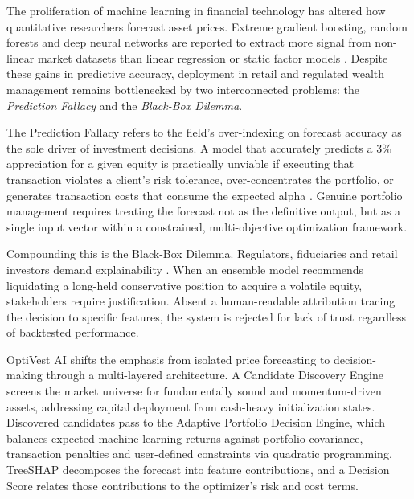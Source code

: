 \documentclass[conference]{IEEEtran}
\begin{document}
The proliferation of machine learning in financial technology has
altered how quantitative researchers forecast asset prices. Extreme
gradient boosting, random forests and deep neural networks are reported
to extract more signal from non-linear market datasets than linear
regression or static factor models \cite{gu2020}. Despite these gains
in predictive accuracy, deployment in retail and regulated wealth
management remains bottlenecked by two interconnected problems: the
\emph{Prediction Fallacy} and the \emph{Black-Box Dilemma}.

The Prediction Fallacy refers to the field's over-indexing on forecast
accuracy as the sole driver of investment decisions. A model that
accurately predicts a $3\%$ appreciation for a given equity is
practically unviable if executing that transaction violates a client's
risk tolerance, over-concentrates the portfolio, or generates
transaction costs that consume the expected alpha \cite{demiguel2009}.
Genuine portfolio management requires treating the forecast not as the
definitive output, but as a single input vector within a constrained,
multi-objective optimization framework.

Compounding this is the Black-Box Dilemma. Regulators, fiduciaries and
retail investors demand explainability \cite{barredoarrieta2020}. When
an ensemble model recommends liquidating a long-held conservative
position to acquire a volatile equity, stakeholders require
justification. Absent a human-readable attribution tracing the decision
to specific features, the system is rejected for lack of trust
regardless of backtested performance.

OptiVest AI shifts the emphasis from isolated price forecasting to
decision-making through a multi-layered architecture. A Candidate
Discovery Engine screens the market universe for fundamentally sound
and momentum-driven assets, addressing capital deployment from
cash-heavy initialization states. Discovered candidates pass to the
Adaptive Portfolio Decision Engine, which balances expected machine
learning returns against portfolio covariance, transaction penalties
and user-defined constraints via quadratic programming. TreeSHAP
\cite{lundberg2020} decomposes the forecast into feature contributions,
and a Decision Score relates those contributions to the optimizer's
risk and cost terms.
\end{document}
